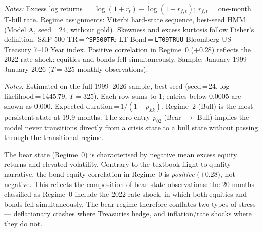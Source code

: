 \documentclass[12pt, a4paper]{article}
\begin{document}
\begin{table}[htbp]
{\begin{tabular}{llrrrrrrc}
\bottomrule
\end{tabular}}
\begin{minipage}{\linewidth}
\vspace{4pt}\footnotesize
\textit{Notes:} Excess log returns $= \log(1+r_t) - \log(1+r_{f,t})$; $r_{f,t}$ = one-month T-bill rate.
Regime assignments: Viterbi hard-state sequence, best-seed HMM (Model A, seed\,=\,24, without gold).
Skewness and excess kurtosis follow Fisher's definition.
S\&P 500 TR\,=\,\texttt{\^{}SP500TR}; LT Bond\,=\,\texttt{LT09TRUU} Bloomberg US Treasury 7--10 Year index.
Positive correlation in Regime~0 (+0.28) reflects the 2022 rate shock: equities and bonds fell simultaneously.
Sample: January 1999 -- January 2026 ($T = 325$ monthly observations).
\end{minipage}
\end{table}



\begin{table}[htbp]
\centering
\caption{HMM Transition Probability Matrix and Regime Persistence (Model A, 1999--2026)}
\label{tab:transition}
\setlength{\tabcolsep}{8pt}
\small
{}
\begin{minipage}{\linewidth}
\vspace{4pt}\footnotesize
\textit{Notes:} Estimated on the full 1999--2026 sample, best seed (seed\,=\,24, log-likelihood\,=\,1445.79, $T=325$).
Each row sums to 1; entries below 0.0005 are shown as 0.000.
Expected duration\,=\,$1/(1-p_{kk})$. Regime~2 (Bull) is the most persistent state at 19.9 months.
The zero entry $p_{02}$ (Bear $\to$ Bull) implies the model never transitions directly from a crisis state to a bull state without passing through the transitional regime.
\end{minipage}
\end{table}

The bear state (Regime~0) is characterised by negative mean excess equity returns and
elevated volatility. Contrary to the textbook flight-to-quality narrative, the
bond-equity correlation in Regime~0 is \textit{positive} ($+0.28$), not negative.
This reflects the composition of bear-state observations: the 20 months classified as
Regime~0 include the 2022 rate shock, in which both equities and bonds fell simultaneously.
The bear regime therefore conflates two types of stress --- deflationary crashes where
Treasuries hedge, and inflation/rate shocks where they do not.
\end{document}
